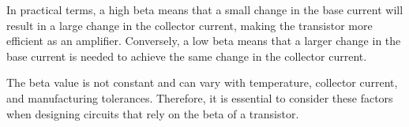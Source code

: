 In practical terms, a high beta means that a small change in the base current will result in a large change in the collector current, making the transistor more efficient as an amplifier. Conversely, a low beta means that a larger change in the base current is needed to achieve the same change in the collector current.

The beta value is not constant and can vary with temperature, collector current, and manufacturing tolerances. Therefore, it is essential to consider these factors when designing circuits that rely on the beta of a transistor.

